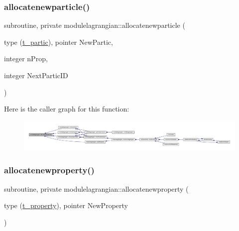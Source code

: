 \subsubsection{\texorpdfstring{allocatenewparticle()}{allocatenewparticle()}}
{\footnotesize\ttfamily subroutine, private modulelagrangian\+::allocatenewparticle (\begin{DoxyParamCaption}\item[{type (\mbox{\hyperlink{structmodulelagrangian_1_1t__partic}{t\+\_\+partic}}), pointer}]{New\+Partic,  }\item[{integer}]{n\+Prop,  }\item[{integer}]{Next\+Partic\+ID }\end{DoxyParamCaption})\hspace{0.3cm}{\ttfamily [private]}}

Here is the caller graph for this function\+:\nopagebreak
\begin{figure}[H]
\begin{center}
\leavevmode
\includegraphics[width=350pt]{namespacemodulelagrangian_aaf265958f7abd87e754e7ff44745bdf0_icgraph}
\end{center}
\end{figure}
\mbox{\label{namespacemodulelagrangian_a85933ed7a699fa0b842b3a0c17c94bbb}} 
\subsubsection{\texorpdfstring{allocatenewproperty()}{allocatenewproperty()}}
{\footnotesize\ttfamily subroutine, private modulelagrangian\+::allocatenewproperty (\begin{DoxyParamCaption}\item[{type (\mbox{\hyperlink{structmodulelagrangian_1_1t__property}{t\+\_\+property}}), pointer}]{New\+Property }\end{DoxyParamCaption})\hspace{0.3cm}{\ttfamily [private]}}

